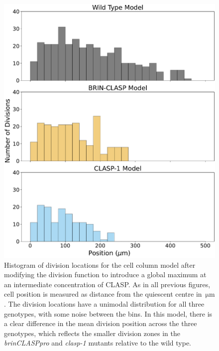 \documentclass[referee,pdflatex,sn-mathphys-num]{sn-jnl}
\newcommand{\um}{\,\unit{\micro\metre}}
\begin{document}
\begin{appendices}
\begin{figure}[!htp]
  \centering
  \includegraphics[width=\textwidth]{column-modified-histogram.pdf}
  \caption{Histogram of division locations for the cell column model after modifying the division function to introduce a global maximum at an intermediate concentration of CLASP. As in all previous figures, cell position is measured as distance from the quiescent centre in $\um$. The division locations have a unimodal distribution for all three genotypes, with some noise between the bins. In this model, there is a clear difference in the mean division position across the three genotypes, which reflects the smaller division zones in the \emph{brinCLASPpro} and \emph{clasp-1} mutants relative to the wild type.}
  \label{column-modified-histogram}
\end{figure}

\end{appendices}
\end{document}
